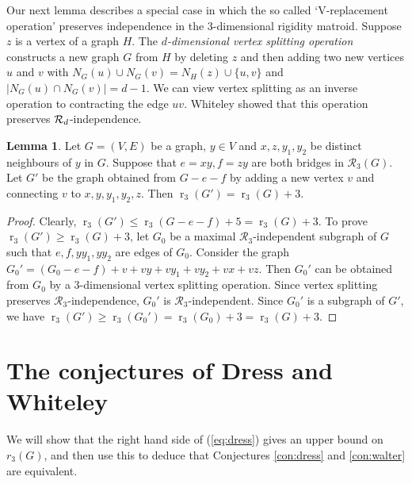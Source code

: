 \documentclass[11pt,a4paper]{article}
\theoremstyle{definition}
\newtheorem{lemma}[theorem]{Lemma}
\DeclareMathOperator{\rr}{r}
\begin{document}
Our next lemma describes a  special case in which the so called `V-replacement operation' preserves independence in the 3-dimensional rigidity matroid. 
Suppose $z$ is a vertex of a graph $H$. 
The {\em $d$-dimensional vertex splitting operation} constructs a new graph $G$ from $H$  by deleting $z$ and then adding two new vertices $u$ and $v$ with $N_G(u)\cup N_G(v)=N_H(z)\cup \{u,v\}$ 
and $|N_G(u)\cap N_G(v)|= d-1$.
We can view vertex splitting as an inverse operation to contracting the edge $uv$.
Whiteley \cite{Wvsplit,Wlong} showed that 
this operation preserves ${\cal R}_d$-independence.

\begin{lemma}\label{lem:2ext:split}
Let $G=(V,E)$ be a graph, $y\in V$ and $x,z,y_1,y_2$ be distinct neighbours of $y$ in $G$. 
Suppose that 
$e=xy,f=zy$ 
are both bridges in $\mathcal{R}_3(G)$. 
Let $G'$ be the graph obtained from $G-e-f$ by adding a new vertex $v$ and connecting $v$ to $x,y,y_1,y_2, z$.
Then $\rr_3(G')=\rr_3(G)+3$.
\end{lemma}
\begin{proof}
Clearly, $\rr_3(G')\leq \rr_3(G-e-f)+5= \rr_3(G)+3$. To prove $\rr_3(G')\geq \rr_3(G)+3$, let
$G_0$ be a maximal $\mathcal{R}_3$-independent subgraph of $G$ such that  
$e,f,yy_1,yy_2$ are edges of $G_0$. Consider the graph $G_0'=(G_0-e-f)+v+vy+vy_1+vy_2+vx+vz$. Then $G_0'$ can be obtained from $G_0$ by a 3-dimensional vertex splitting operation.
Since vertex splitting preserves $\mathcal{R}_3$-independence, 
$G_0'$ is $\mathcal{R}_3$-independent. Since $G_0'$ is a subgraph of $G'$, we have $\rr_3(G')\geq \rr_3(G_0') = \rr_3(G_0)+3=\rr_3(G)+3$.
\end{proof}



\section{The conjectures of Dress and Whiteley}\label{sec:dress}
\label{sec:DW}

We will show that
the right hand side of (\ref{eq:dress}) 
gives an upper bound 
on  
$r_3(G)$, and then use this to deduce that
Conjectures \ref{con:dress} and \ref{con:walter} are equivalent.
\end{document}
